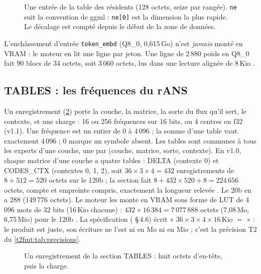 \begin{figure}[ht]
\centering
\TdFmtResident
\caption[Une entrée de la table des résidents]{Une entrée de la table des résidents (128 octets, seize par rangée). \texttt{ne} suit la convention de ggml : \texttt{ne[0]} est la dimension la plus rapide. Le décalage est compté depuis le début de la zone de données.}
\label{t2fmt:fig:resident}
\end{figure}

L'enchâssement d'entrée \texttt{token\_embd} (Q8\_0, 0,615\,Go) n'est \emph{jamais} monté en VRAM : le moteur en lit une ligne par jeton. Une ligne de 2\,880 poids en Q8\_0 fait $90$ blocs de 34 octets, soit 3\,060 octets, lus dans une lecture alignée de 8\,Kio \calc.

\subsection{TABLES : les fréquences du rANS}

Un enregistrement (\cref{t2fmt:fig:table}) porte la couche, la matrice, la sorte du flux qu'il sert, le contexte, et une charge : 16 ou 256 fréquences sur 16 bits, ou 4 centres en f32 (v1.1). Une fréquence est un entier de 0 à 4\,096 ; la somme d'une table vaut exactement 4\,096 ; 0 marque un symbole absent. Les tables sont communes à tous les experts d'une couche, une par (couche, matrice, sorte, contexte). En v1.0, chaque matrice d'une couche a quatre tables : DELTA (contexte 0) et CODES\_CTX (contextes 0, 1, 2), soit $36 \times 3 \times 4 = 432$ enregistrements de $8 + 512 = 520$ octets sur le 120b ; la section fait $8 + 432 \times 520 + 8 = 224\,656$ octets, compte et empreinte compris, exactement la longueur relevée \calc. Le 20b en a 288 (149\,776 octets). Le moteur les monte en VRAM sous forme de LUT de 4\,096 mots de 32 bits (16\,Kio chacune) : $432 \times 16\,384 = 7\,077\,888$ octets (7,08\,Mo, 6,75\,Mio) pour le 120b \calc. La spécification ( §\,4.6) écrit « $36 \times 3 \times 4 \times 16$\,Kio $=$  » : le produit est juste, son écriture ne l'est ni en Mo ni en Mio ; c'est la précision T2 du \cref{t2fmt:tab:precisions}.

\begin{figure}[ht]
\centering
\TdFmtTable
\caption[Un enregistrement de la section TABLES]{Un enregistrement de la section TABLES : huit octets d'en-tête, puis la charge.}
\label{t2fmt:fig:table}
\end{figure}

